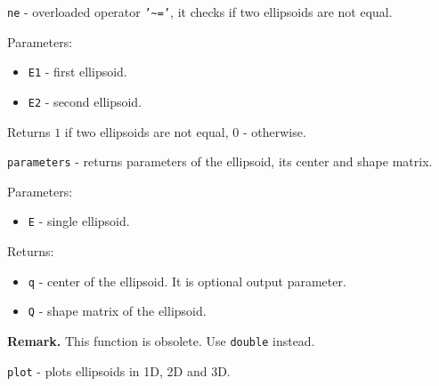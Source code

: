 \documentclass{report}
\begin{document}


\newpage

{\Large {\tt ne}} - overloaded operator {\tt '\~{ }='},
it checks if two ellipsoids are not equal.

Parameters:
\begin{itemize}
\item {\tt E1} - first ellipsoid.
\item {\tt E2} - second ellipsoid.
\end{itemize}

Returns $1$ if two ellipsoids are not equal, $0$ - otherwise.



\newpage

{\Large {\tt parameters}} - returns parameters of the ellipsoid, its center
and shape matrix.

Parameters:
\begin{itemize}
\item {\tt E} - single ellipsoid.
\end{itemize}

Returns:
\begin{itemize}
\item {\tt q} - center of the ellipsoid. It is optional output parameter.
\item {\tt Q} - shape matrix of the ellipsoid.
\end{itemize}

{\bf Remark.} This function is obsolete. Use {\tt double} instead.

\newpage

{\Large {\tt plot}} - plots ellipsoids in 1D, 2D and 3D.
\end{document}
